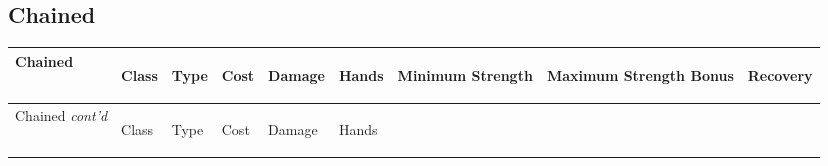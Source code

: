 \documentclass[twoside]{book}
\begin{document}
\begin{multicols}{2}
    \hspace{-2ex}
\vspace{1ex}


    
\end{multicols}
  
    

\subsection{Chained}
    
\begin{longtable}{p{1.25in}llllp{2em}p{3em}p{3em}l} 
  Chained& \begin{turn}{70}{Class}\end{turn}
          & \begin{turn}{70}{Type}\end{turn}
          & \begin{turn}{70}{Cost}\end{turn}
          & \begin{turn}{70}{Damage}\end{turn}
          & \begin{turn}{70}{Hands}\end{turn}
          & \begin{turn}{70}{Minimum Strength}\end{turn}
          & \begin{turn}{70}{Maximum Strength Bonus}\end{turn}
          & \begin{turn}{70}{Recovery}\end{turn}
          \\
  \hline
  \hline
  \endfirsthead
  Chained \textit{cont'd}
        & \begin{turn}{70}{Class}\end{turn}
          & \begin{turn}{70}{Type}\end{turn}
          & \begin{turn}{70}{Cost}\end{turn}
          & \begin{turn}{70}{Damage}\end{turn}
          & \begin{turn}{70}{Hands}\end{turn}

\end{longtable}
\end{document}
